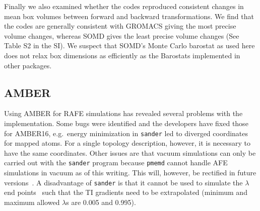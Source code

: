 \documentclass[journal=jctcce,manuscript=article]{achemso}
\newcommand{\progname}[1]{\texttt{#1}}
\begin{document}
\begin{table}[]
  \begin{minipage}{\linewidth}
    \caption{Cycle closure errors (in \si{kcal.mol^{-1}}) for  ethane$ \rightarrow$ methanol $\rightarrow$ methane 
$\rightarrow$ ethane}\label{tab:cycle-closure}
  \end{minipage}
\end{table}

Finally we also examined whether the codes reproduced consistent changes in mean box volumes between forward and backward transformations. We find that the codes are generally consistent with GROMACS giving the most precise volume changes, whereas SOMD gives the least precise volume changes (See Table S2 in the SI). We suspect that SOMD's Monte Carlo barostat as used here does not relax box dimensions as efficiently as the Barostats implemented in other packages.

\subsection{AMBER}
\label{sec:amber-results}

Using AMBER for RAFE simulations has revealed several problems with the implementation.  Some bugs were identified and the developers have fixed those for AMBER16, e.g.\ energy minimization in \progname{sander} led to 
diverged coordinates for mapped atoms.  For a single topology description, 
however, it is necessary to have the same coordinates.  Other issues are that 
vacuum simulations can only be carried out with the \progname{sander} program 
because \progname{pmemd} cannot handle AFE simulations in vacuum as of this writing.  This will, however, be rectified in future 
versions~\cite{doi:10.1021/acs.jctc.7b00102}.  A disadvantage of 
\progname{sander} is that it cannot be used to simulate the $\lambda$ end 
points~\cite{doi:10.1021/ct400340s} such that the TI gradients need to be 
extrapolated (minimum and maximum allowed $\lambda$s are 0.005 and 0.995). 
\end{document}
